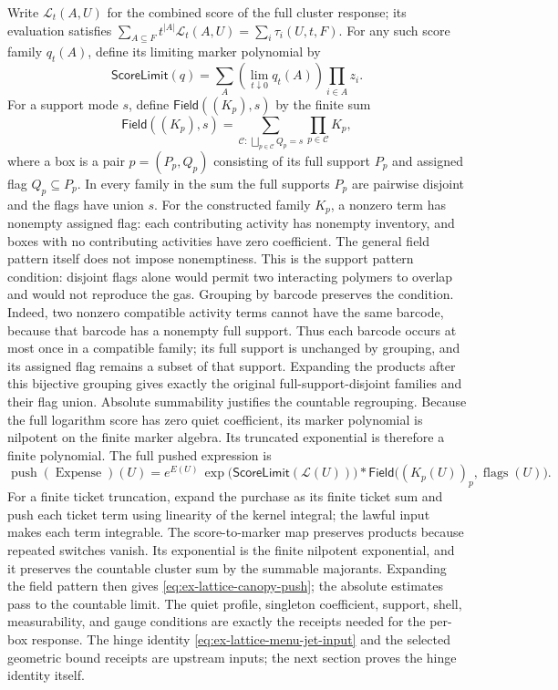 Write $\mathcal L_t(A,U)$ for the combined score of the full cluster
response; its evaluation satisfies
$\sum_{A\subseteq F}t^{|A|}\mathcal L_t(A,U)=\sum_i\tau_i(U,t,F)$.
For any such score family $q_t(A)$, define its limiting marker polynomial by
\[
 \mathsf{ScoreLimit}(q)=\sum_A\left(\lim_{t\downarrow0}q_t(A)\right)
                           \prod_{i\in A}z_i.
\]
For a support mode $s$, define $\mathsf{Field}((K_p),s)$ by the finite sum
\[
\mathsf{Field}((K_p),s)=\sum_{\mathcal C:\,\bigsqcup_{p\in\mathcal C}Q_p=s}
                                  \prod_{p\in\mathcal C}K_p,
\]
where a box is a pair $p=(P_p,Q_p)$ consisting of its full support $P_p$
and assigned flag $Q_p\subseteq P_p$. In every family in the sum the full
supports $P_p$ are pairwise disjoint and the flags have union $s$. For
the constructed family $K_p$, a nonzero term has nonempty assigned flag:
each contributing activity has nonempty inventory, and boxes with no
contributing activities have zero coefficient. The general field pattern
itself does not impose nonemptiness. This is the support pattern
condition: disjoint flags alone would permit two interacting polymers to
overlap and would not reproduce the gas. Grouping by barcode preserves the
condition. Indeed, two nonzero compatible activity terms cannot have the same
barcode, because that barcode has a nonempty full support. Thus each
barcode occurs at most once in a compatible family; its full support is
unchanged by grouping, and its assigned flag remains a subset of that
support. Expanding the products after this bijective grouping gives exactly
the original full-support-disjoint families and their flag union. Absolute
summability justifies the countable regrouping. Because the full logarithm score has zero quiet coefficient, its marker
polynomial is nilpotent on the finite marker algebra. Its truncated
exponential is therefore a finite polynomial. The full pushed expression is
\begin{equation}
 \operatorname{push}(\operatorname{Expense})(U)
 =e^{E(U)}\,\exp\!\bigl(\mathsf{ScoreLimit}(\mathcal L(U))\bigr)
  *\mathsf{Field}\bigl((K_p(U))_p,\operatorname{flags}(U)\bigr).
 \label{eq:ex-lattice-canopy-push}
\end{equation}
For a finite ticket truncation, expand the purchase as its finite ticket
sum and push each ticket term using linearity of the kernel integral; the
lawful input makes each term integrable. The score-to-marker map preserves
products because repeated switches vanish. Its exponential is the finite
nilpotent exponential, and it preserves the countable cluster sum by the
summable majorants. Expanding the field pattern then gives
\eqref{eq:ex-lattice-canopy-push}; the absolute estimates pass to the
countable limit. The quiet profile, singleton coefficient, support, shell,
measurability, and gauge conditions are exactly the receipts needed for the
per-box response. The hinge identity \eqref{eq:ex-lattice-menu-jet-input}
and the selected geometric bound receipts are upstream inputs; the next
section proves the hinge identity itself.

